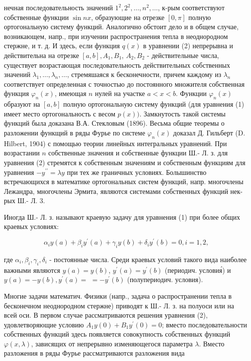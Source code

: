 \documentclass[10pt]{article}
\begin{document}
нечная последовательность значений $1^{2}, 2^{2}, \ldots, n^{2}, \ldots$, к-рым соответствуют собственные функции $\sin n x$, образующие на отрезке $[0, \pi]$ полную ортогональную систему функций. Аналогично обстоит дело и в общем случае, возникающем, напр., при изучении распространения тепла в неоднородном стержне, и т. д. И здесь, если функция $q(x)$ в уравнении (2) непрерывна и действительна на отрезке $[a, b], A_{1}, B_{1}$, $A_{2}, B_{2}$ - действительные числа, существует возрастающая последовательность действительных собственных значений $\lambda_{1}, \ldots, \lambda_{n}, \ldots$, стремяшаяся к бесконечности, причем каждому из $\lambda_{n}$ соответствует определенная с точностью до постоянного множителя собственная функция $\varphi_{n}(x)$, имеющая $n$ нулей на участке $a<x<b$. Функции $\varphi_{n}(x)$ образуют на $[a, b]$ полную ортогональную систему функций (для уравнения (1) имеет место ортогональность с весом $p(x))$. Замкнутость такой системы функций была доказана В.А. Стекловым (1896). Весьма общие теоремы о разложении функщий в ряды Фурье по системе $\varphi_{n}(x)$ доказал Д. Гильберт (D. Hilbert, 1904) с помощью теории линейных интегральных уравнений. При возрастании $n$ собственные значения и собственные функции Ш.- Л. з. для уравнения (2) стремятся к собственным значениям и собственным функциям для уравнения $-y^{\prime \prime}=\lambda y$ при тех же граничных условиях. Болышинство встречающихся в математике ортогональных систем функций, напр. многочлены Лежандра, многочлены Эрмита, являются системами собственных функций нек-рых Ш.- Л. 3.



Иногда Ш.- Л. з. называют краевую задачу для уравнения (1) при более общих краевых условиях:



\[

\alpha_{i} y(a)+\beta_{i} y^{\prime}(a)+\gamma_{i} y(b)+\delta_{i} y^{\prime}(b)=0, i=1,2,

\]



где $\alpha_{i}, \beta_{i}, \gamma_{i}, \delta_{i}$ - постоянные числа. Среди краевых условий такого вида наиболее важными являются $y(a)=y(b)$, $y^{\prime}(a)=y^{\prime}(b)$ (периодич. условия́) и $y(a)=-y(b), y^{\prime}(a)=$ $=-y^{\prime}(b)$ (полупериодич. условия).



Многие задачи математич. Физики (напр., задача о распространении тепла в бесконечном неоднородном стержне) приводят к Ш.- Л. з. на полуоси или на всей оси. В первом случае рассматриваются решения уравнения (2), удовлетворяющие условию $A_{1} y(0)+B_{1} y^{\prime}(0)=0$; вместо последовательности собственных функций здесь появляется совокупность собственных функций $\varphi(x, \lambda)$, зависящих от непрерывно изменяющегося параметра $\lambda$. Вместо разложения в ряды Фурье рассматриваются разложения вида
\end{document}
